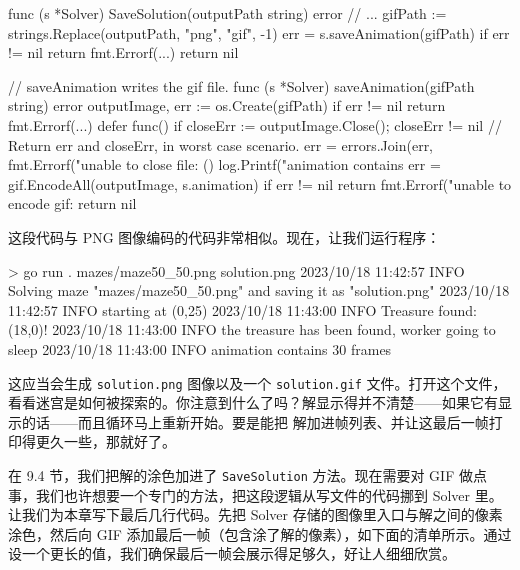 \begin{gocode}[title={代码清单 9.36 \texttt{imagefile.go}：生成 GIF 文件}]
func (s *Solver) SaveSolution(outputPath string) error {
     // ...
    gifPath := strings.Replace(outputPath, "png", "gif", -1)
    err = s.saveAnimation(gifPath)
    if err != nil {
        return fmt.Errorf(...)
    }
    return nil
}

// saveAnimation writes the gif file.
func (s *Solver) saveAnimation(gifPath string) error {
    outputImage, err := os.Create(gifPath)
    if err != nil {
        return fmt.Errorf(...)
    }
    defer func() {
        if closeErr := outputImage.Close(); closeErr != nil {
            // Return err and closeErr, in worst case scenario.
            err = errors.Join(err,
                fmt.Errorf("unable to close file: %
        }
    }()
    log.Printf("animation contains %
    err = gif.EncodeAll(outputImage, s.animation)
    if err != nil {
        return fmt.Errorf("unable to encode gif: %
    }
    return nil
}
\end{gocode}

这段代码与 PNG 图像编码的代码非常相似。现在，让我们运行程序：

\begin{shellcode}[]
> go run . mazes/maze50_50.png solution.png
2023/10/18 11:42:57 INFO Solving maze "mazes/maze50_50.png" and saving it
as "solution.png"
2023/10/18 11:42:57 INFO starting at (0,25)
2023/10/18 11:43:00 INFO Treasure found: (18,0)!
2023/10/18 11:43:00 INFO the treasure has been found, worker going to sleep
2023/10/18 11:43:00 INFO animation contains 30 frames
\end{shellcode}

这应当会生成 \texttt{solution.png} 图像以及一个 \texttt{solution.gif} 文件。打开这个文件，看看迷宫是如何被探索的。你注意到什么了吗？解显示得并不清楚——如果它有显示的话——而且循环马上重新开始。要是能把
解加进帧列表、并让这最后一帧打印得更久一些，那就好了。

在 9.4 节，我们把解的涂色加进了 \texttt{SaveSolution} 方法。现在需要对 GIF 做点事，我们也许想要一个专门的方法，把这段逻辑从写文件的代码挪到 Solver 里。让我们为本章写下最后几行代码。先把 Solver 存储的图像里入口与解之间的像素涂色，然后向 GIF 添加最后一帧（包含涂了解的像素），如下面的清单所示。通过设一个更长的值，我们确保最后一帧会展示得足够久，好让人细细欣赏。

